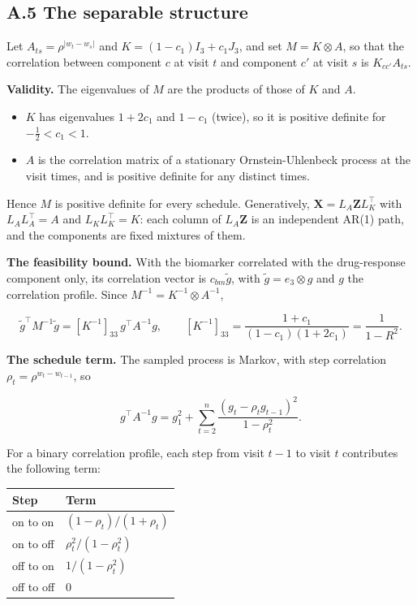 \documentclass[
  11pt,
]{article}
\newcounter{none} %
\providecommand{\tightlist}{%
  \setlength{\itemsep}{0pt}\setlength{\parskip}{0pt}}
\begin{document}
\subsection*{A.5 The separable structure}\label{a.5-the-separable-structure}

Let \(A_{ts} = \rho^{\lvert w_t - w_s\rvert}\) and
\(K = (1 - c_1)I_3 + c_1 J_3\), and set \(M = K \otimes A\), so that the
correlation between component \(c\) at visit \(t\) and component \(c'\) at
visit \(s\) is \(K_{cc'}A_{ts}\).

\textbf{Validity.} The eigenvalues of \(M\) are the products of those of \(K\)
and \(A\).

\begin{itemize}
\tightlist
\item
  \(K\) has eigenvalues \(1 + 2c_1\) and \(1 - c_1\) (twice), so it is
  positive definite for \(-\tfrac12 < c_1 < 1\).
\item
  \(A\) is the correlation matrix of a stationary Ornstein-Uhlenbeck
  process at the visit times, and is positive definite for any
  distinct times.
\end{itemize}

Hence \(M\) is positive definite for every schedule. Generatively,
\(\mathbf X = L_A\mathbf Z L_K^\top\) with \(L_AL_A^\top = A\) and
\(L_KL_K^\top = K\): each column of \(L_A\mathbf Z\) is an independent AR(1)
path, and the components are fixed mixtures of them.

\textbf{The feasibility bound.} With the biomarker correlated with the
drug-response component only, its correlation vector is
\(c_{bm}\tilde g\), with \(\tilde g = e_3 \otimes g\) and \(g\) the
correlation profile. Since \(M^{-1} = K^{-1} \otimes A^{-1}\),

\[\tilde g^\top M^{-1} \tilde g = [K^{-1}]_{33}\, g^\top A^{-1} g,
\qquad
[K^{-1}]_{33} = \frac{1 + c_1}{(1 - c_1)(1 + 2c_1)} = \frac{1}{1 - R^2}.\]

\textbf{The schedule term.} The sampled process is Markov, with
step correlation \(\rho_t = \rho^{w_t - w_{t-1}}\), so

\[g^\top A^{-1} g = g_1^2 + \sum_{t=2}^{n}
  \frac{(g_t - \rho_t g_{t-1})^2}{1 - \rho_t^2}.\]

For a binary correlation profile, each step from visit \(t-1\) to visit
\(t\) contributes the following term:

{\def\LTcaptype{none} %
\begin{longtable}[]{@{}ll@{}}
\toprule\noalign{}
Step & Term \\
\midrule\noalign{}
\endhead
\bottomrule\noalign{}
\endlastfoot
on to on & \((1 - \rho_t)/(1 + \rho_t)\) \\
on to off & \(\rho_t^2/(1 - \rho_t^2)\) \\
off to on & \(1/(1 - \rho_t^2)\) \\
off to off & 0 \\
\end{longtable}
}
\end{document}
